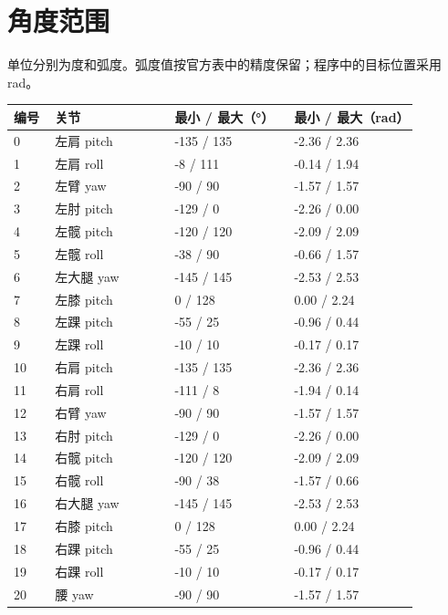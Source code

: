 \section{角度范围}
单位分别为度和弧度。弧度值按官方表中的精度保留；程序中的目标位置采用 rad。

\begingroup\small\renewcommand{\arraystretch}{1.15}
\begin{longtable}{@{}P{0.09\linewidth}P{0.26\linewidth}P{0.26\linewidth}P{0.27\linewidth}@{}}
\toprule
\textbf{编号} & \textbf{关节} & \textbf{最小 / 最大（°）} & \textbf{最小 / 最大（rad）} \\
\midrule{} & 左肩 pitch & -135 / 135 & -2.36 / 2.36 \\
1 & 左肩 roll & -8 / 111 & -0.14 / 1.94 \\
2 & 左臂 yaw & -90 / 90 & -1.57 / 1.57 \\
3 & 左肘 pitch & -129 / 0 & -2.26 / 0.00 \\
4 & 左髋 pitch & -120 / 120 & -2.09 / 2.09 \\
5 & 左髋 roll & -38 / 90 & -0.66 / 1.57 \\
6 & 左大腿 yaw & -145 / 145 & -2.53 / 2.53 \\
7 & 左膝 pitch & 0 / 128 & 0.00 / 2.24 \\
8 & 左踝 pitch & -55 / 25 & -0.96 / 0.44 \\
9 & 左踝 roll & -10 / 10 & -0.17 / 0.17 \\
10 & 右肩 pitch & -135 / 135 & -2.36 / 2.36 \\
11 & 右肩 roll & -111 / 8 & -1.94 / 0.14 \\
12 & 右臂 yaw & -90 / 90 & -1.57 / 1.57 \\
13 & 右肘 pitch & -129 / 0 & -2.26 / 0.00 \\
14 & 右髋 pitch & -120 / 120 & -2.09 / 2.09 \\
15 & 右髋 roll & -90 / 38 & -1.57 / 0.66 \\
16 & 右大腿 yaw & -145 / 145 & -2.53 / 2.53 \\
17 & 右膝 pitch & 0 / 128 & 0.00 / 2.24 \\
18 & 右踝 pitch & -55 / 25 & -0.96 / 0.44 \\
19 & 右踝 roll & -10 / 10 & -0.17 / 0.17 \\
20 & 腰 yaw & -90 / 90 & -1.57 / 1.57 \\
\bottomrule\end{longtable}\endgroup
\normalsize\renewcommand{\arraystretch}{1.25}
